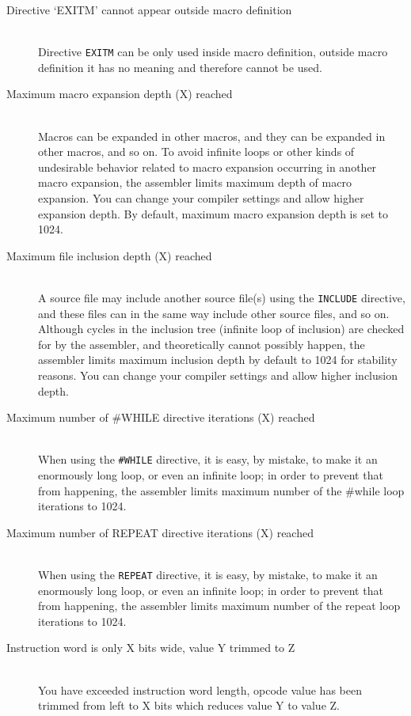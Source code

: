 \begin{description}
        \item[Directive `EXITM' cannot appear outside macro definition]~\\
            Directive \texttt{EXITM} can be only used inside macro definition, outside macro definition it has no meaning and therefore cannot be used.
        \item[Maximum macro expansion depth (X) reached]~\\
            Macros can be expanded in other macros, and they can be expanded in other macros, and so on. To avoid infinite loops or other kinds of undesirable behavior related to macro expansion occurring in another macro expansion, the assembler limits maximum depth of macro expansion. You can change your compiler settings and allow higher expansion depth. By default, maximum macro expansion depth is set to 1024.
        \item[Maximum file inclusion depth (X) reached]~\\
            A source file may include another source file(s) using the \texttt{INCLUDE} directive, and these files can in the same way include other source files, and so on. Although cycles in the inclusion tree (infinite loop of inclusion) are checked for by the assembler, and theoretically cannot possibly happen, the assembler limits maximum inclusion depth by default to 1024 for stability reasons. You can change your compiler settings and allow higher inclusion depth.
        \item[Maximum number of \#WHILE directive iterations (X) reached]~\\
            When using the \texttt{\#WHILE} directive, it is easy, by mistake, to make it an enormously long loop, or even an infinite loop; in order to prevent that from happening, the assembler limits maximum number of the \#while loop iterations to 1024.
        \item[Maximum number of REPEAT directive iterations (X) reached]~\\
            When using the \texttt{REPEAT} directive, it is easy, by mistake, to make it an enormously long loop, or even an infinite loop; in order to prevent that from happening, the assembler limits maximum number of the repeat loop iterations to 1024.
        \item[Instruction word is only X bits wide, value Y trimmed to Z]~\\
            You have exceeded instruction word length, opcode value has been trimmed from left to X bits which reduces value Y to value Z.

\end{description}
